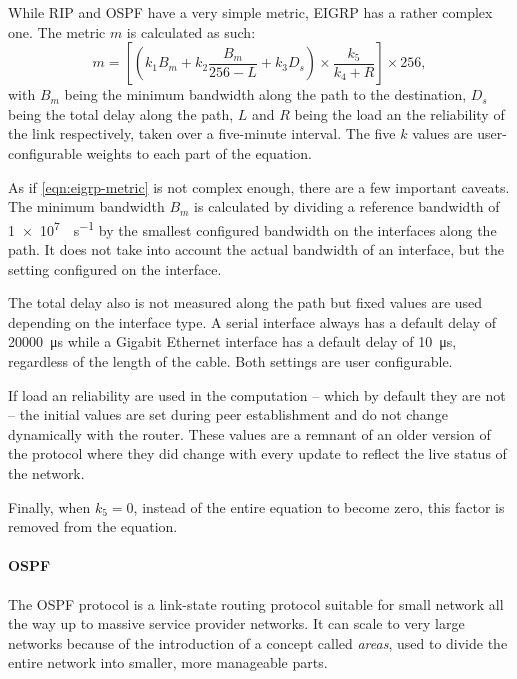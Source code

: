 While \acs{RIP} and \acs{OSPF} have a very simple metric, \acs{EIGRP} has a rather complex one.
The metric $m$ is calculated as such:
\begin{equation}
m = \left[\left(k_1 B_m  + k_2 \frac{B_m}{256-L} + k_3 D_s\right) \times \frac{k_5}{k_4 + R}\right] \times 256,
\label{eqn:eigrp-metric}
\end{equation}
with $B_m$ being the minimum bandwidth along the path to the destination, $D_s$ being the total delay along the path, $L$ and $R$ being the load an the reliability of the link respectively, taken over a five-minute interval.
The five $k$ values are user-configurable weights to each part of the equation.

As if \cref{eqn:eigrp-metric} is not complex enough, there are a few important caveats.
The minimum bandwidth $B_m$ is calculated by dividing a reference bandwidth of \SI{1e7}{\bit\per\second} by the smallest configured bandwidth on the interfaces along the path.
It does not take into account the actual bandwidth of an interface, but the setting configured on the interface.

The total delay also is not measured along the path but fixed values are used depending on the interface type.
A serial interface always has a default delay of \SI{20000}{\micro\second} while a Gigabit Ethernet interface has a default delay of \SI{10}{\micro\second}, regardless of the length of the cable.
Both settings are user configurable.

If load an reliability are used in the computation -- which by default they are not -- the initial values are set during peer establishment and do not change dynamically with the router.
These values are a remnant of an older version of the protocol where they did change with every update to reflect the live status of the network.

Finally, when $k_5=0$, instead of the entire equation to become zero, this factor is removed from the equation.

\paragraph{\acf{OSPF}}
The \acl{OSPF} protocol is a link-state routing protocol suitable for small network all the way up to massive service provider networks.
It can scale to very large networks because of the introduction of a concept called \emph{areas}, used to divide the entire network into smaller, more manageable parts.

